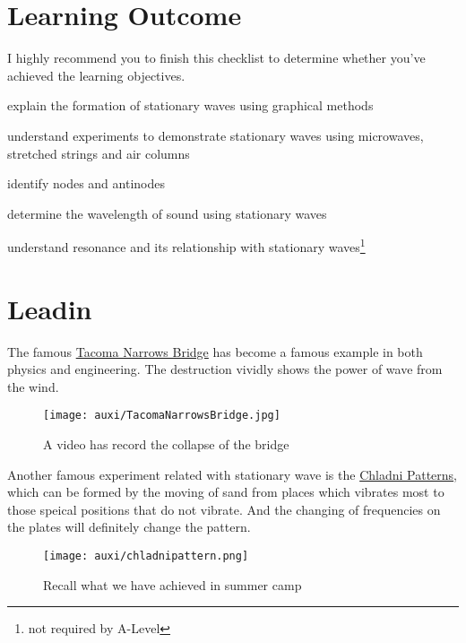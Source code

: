 \documentclass[a4paper]{tufte-handout}
\title{}
\author{Sanjin Zhao}
\date{21st Nov, 2022}  %
\begin{document}
\maketitle%
\section*{Learning Outcome}
I highly recommend you to finish this checklist to determine whether you've achieved the learning objectives.
\begin{todolist}
  \item explain the formation of stationary waves using graphical methods
  \item understand experiments to demonstrate stationary waves using microwaves, stretched strings and air columns
  \item identify nodes and antinodes
  \item determine the wavelength of sound using stationary waves
  \item understand resonance and its relationship with stationary waves\footnote{not required by A-Level}
\end{todolist}
\clearpage

\section{Leadin}
The famous \href{https://www.youtube.com/watch?v=y0xohjV7Avo}{Tacoma Narrows Bridge} has become a famous example in both physics and engineering. The destruction vividly shows the power of wave from the wind.
\begin{figure}[h]
\centering
\texttt{[image: auxi/TacomaNarrowsBridge.jpg]}
\caption{A video has record the collapse of the bridge}
\end{figure}

Another famous experiment related with stationary wave is the \href{https://www.pasco.com/products/lab-apparatus/waves-and-sound/ripple-tank-and-standing-waves/se-7319}{Chladni Patterns}, which can be formed by the moving of sand from places which vibrates most to those speical positions that do not vibrate. And the changing of frequencies on the plates will definitely change the pattern.
\begin{figure}[h]
\centering
\texttt{[image: auxi/chladnipattern.png]}
\caption{Recall what we have achieved in summer camp}
\end{figure}
\end{document}
